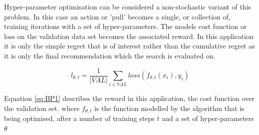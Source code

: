 \documentclass{article}
\begin{document}
	\par

	Hyper-parameter optimisation can be considered a non-stochastic variant of this problem. In this case an action or 'pull' becomes a single, or collection of, training iterations with a set of hyper-parameters. The models cost function or loss on the validation data set becomes the associated reward.  In this application it is only the simple regret that is of interest rather than the cumulative regret as it is only the final recommendation which the search is evaluated on.


		\begin{equation}\label{eq:BP1}	l_{\theta,t} = \frac{1}{|VAL|} \sum_{i \in VAL} loss(f_{\theta,t}(x_i),y_i)\end{equation}



	Equation \ref{eq:BP1} describes the reward in this application, the cost function over the validation set. where \(f_{\theta,t}\) is the function modelled by the algorithm that is being optimised, after a number of training steps \(t\) and a set of hyper-parameters \(\theta\)
\end{document}
